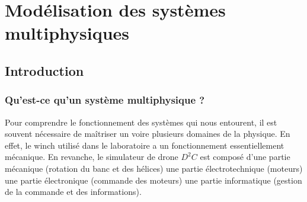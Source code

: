 \setchapterpreamble[u]{\margintoc}
\chapter{Modélisation des systèmes multiphysiques}





\section{Introduction}
\subsection{Qu'est-ce qu'un système multiphysique ?}

Pour comprendre le fonctionnement des systèmes qui nous entourent, il est souvent nécessaire de maîtriser un voire plusieurs domaines de la physique. En effet, le winch utilisé dans le laboratoire a un fonctionnement essentiellement mécanique. En revanche, le simulateur de drone $D^2C$ est composé d'une partie mécanique (rotation du banc et des hélices) une partie électrotechnique (moteurs) une partie électronique (commande des moteurs) une partie informatique (gestion de la commande et des informations). 

